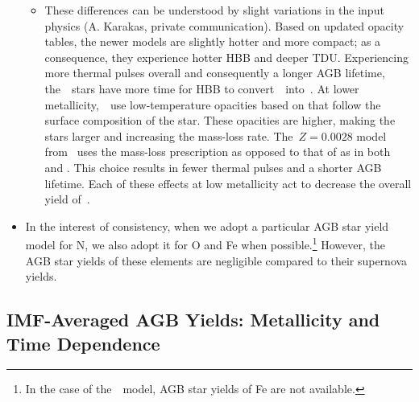 \documentclass[ms.tex]{subfiles}
\begin{document}
\begin{itemize}
\begin{itemize}
		\item These differences can be understood by slight variations in the
		input physics (A. Karakas, private communication).
		Based on updated opacity tables, the newer models are slightly hotter
		and more compact; as a consequence, they experience hotter HBB and
		deeper TDU.
		Experiencing more thermal pulses overall and consequently a longer
		AGB lifetime, the~\karakas~stars have more time for HBB to
		convert~\Ctwelve~into~\Nfourteen.
		At lower metallicity,~\karakas~use low-temperature opacities based on
		\citet{Marigo2002} that follow the surface composition of the star.
		These opacities are higher, making the stars larger and increasing
		the mass-loss rate.
		The~$Z = 0.0028$ model from~\citet{Karakas2018} uses the
		\citet{Bloecker1995} mass-loss prescription as opposed to that of
		\citet{Vassiliadis1993} as in both~\citet{Karakas2010} and
		\citet{Karakas2016}.
		This choice results in fewer thermal pulses and a shorter AGB lifetime.
		Each of these effects at low metallicity act to decrease the overall
		yield of~\Nfourteen.
	\end{itemize}


	\item In the interest of consistency, when we adopt a particular AGB star 
	yield model for N, we also adopt it for O and Fe when possible.\footnote{
		In the case of the~\ventura~model, AGB star yields of Fe are not 
		available. 
	} 
	However, the AGB star yields of these elements are negligible compared to 
	their supernova yields. 
\end{itemize} 

\subsection{IMF-Averaged AGB Yields: Metallicity and Time Dependence} 
\label{sec:yields:imf_agb} 
\end{document}
